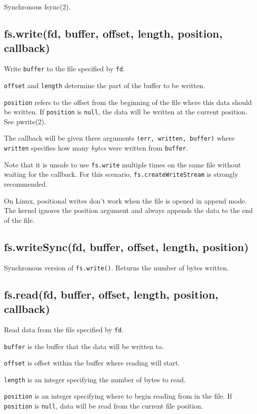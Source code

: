 Synchronous fsync(2).

\subsection{fs.write(fd, buffer, offset, length, position, callback)}

Write \texttt{buffer} to the file specified by \texttt{fd}.

\texttt{offset} and \texttt{length} determine the part of the buffer to
be written.

\texttt{position} refers to the offset from the beginning of the file
where this data should be written. If \texttt{position} is
\texttt{null}, the data will be written at the current position. See
pwrite(2).

The callback will be given three arguments
\texttt{(err, written, buffer)} where \texttt{written} specifies how
many \emph{bytes} were written from \texttt{buffer}.

Note that it is unsafe to use \texttt{fs.write} multiple times on the
same file without waiting for the callback. For this scenario,
\texttt{fs.createWriteStream} is strongly recommended.

On Linux, positional writes don't work when the file is opened in append
mode. The kernel ignores the position argument and always appends the
data to the end of the file.

\subsection{fs.writeSync(fd, buffer, offset, length, position)}

Synchronous version of \texttt{fs.write()}. Returns the number of bytes
written.

\subsection{fs.read(fd, buffer, offset, length, position, callback)}

Read data from the file specified by \texttt{fd}.

\texttt{buffer} is the buffer that the data will be written to.

\texttt{offset} is offset within the buffer where reading will start.

\texttt{length} is an integer specifying the number of bytes to read.

\texttt{position} is an integer specifying where to begin reading from
in the file. If \texttt{position} is \texttt{null}, data will be read
from the current file position.

